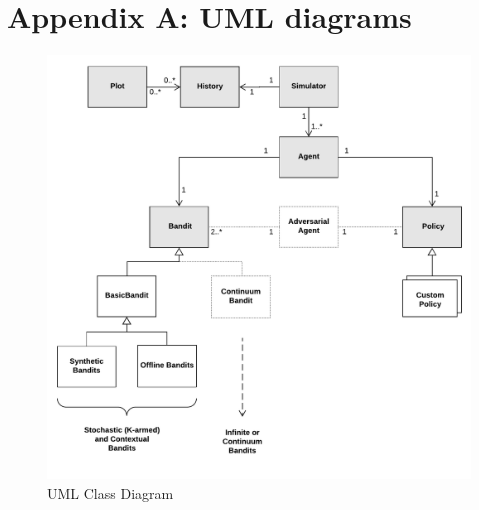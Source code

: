 \documentclass{jss}
\begin{document}
%


\newpage

\section{Appendix A: UML diagrams} \label{uml}

\begin{figure}[H]
  \centering
    \includegraphics[width=.99\textwidth]{fig/contextual_class}

      \caption{ UML Class Diagram}
          \label{fig:contextual_class}
\end{figure}
\end{document}
